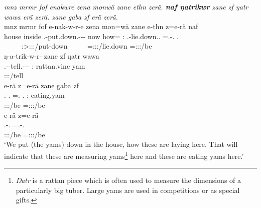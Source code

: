 \begin{exe}
	\ex \emph{mnz mrmr fof enakwre zena monwä zane ethn zerä. \textbf{naf ŋatrikwr} zane zf ŋatr wawa erä zerä. zane gaba zf erä zerä.}\\
	\glll mnz mrmr fof e-nak-w-r-e zena mon=wä zane e-thn z=e-rä naf\\
	house inside {\Emph} \Stnsg.\Alph-put.down.\Ext-\Ndu-\Lk-{\Fnsg} now how={\Emph} \Dem:{\Prox} \Stnsg.\Alph-lie.down.\Ext.{\Ndu} \Prox=\Stnsg.\Alph-\Cop.{\Ndu} \Tsg.{\Erg}\\
	~ ~ ~ {\footnotesize \Fpl:\Sbj>\Stpl:\Obj:\Nonpast:\Ipfv/put-down} ~ ~ ~ {\footnotesize \Prox=\Stpl:\Sbj:\Nonpast:\Ipfv/lie.down} {\footnotesize \Prox=\Stpl:\Sbj:\Nonpast:\Ipfv/be} ~\\
	\sn
	\glll ŋ-a-trik-w-r-\Zero{} zane zf ŋatr wawa\\
	\M.\Alph-\Vc-tell.\Ext-\Ndu-\Lk-\Stsg{} \Dem:{\Prox} {\Imm} rattan.vine yam\\
	{\footnotesize \Stsg:\Sbj:\Nonpast:\Ipfv/tell} ~ ~ ~ ~\\
	\sn
	\glll e-rä z=e-rä zane gaba zf\\
	\Stnsg.\Alph-\Cop.{\Ndu} \Prox=\Stnsg.\Alph-\Cop.{\Ndu} \Dem:{\Prox} eating.yam {\Imm}\\
	{\footnotesize \Stpl:\Sbj:\Nonpast:\Ipfv/be} {\footnotesize \Prox=\Stpl:\Sbj:\Nonpast:\Ipfv/be} ~ ~ ~\\
	\sn
	\glll e-rä z=e-rä\\
	\Stnsg.\Alph-\Cop.{\Ndu} \Prox=\Stnsg.\Alph-\Cop.{\Ndu}\\
	{\footnotesize \Stpl:\Sbj:\Nonpast:\Ipfv/be} {\footnotesize \Prox=\Stpl:\Sbj:\Nonpast:\Ipfv/be}\\
	\trans `We put (the yams) down in the house, how these are laying here. That will indicate that these are measuring yams\footnote{\emph{Ŋatr} is a rattan piece which is often used to measure the dimensions of a particularly big tuber. Large yams are used in competitions or as special gifts.} here and these are eating yams here.'\\ 
	\label{ex167}
\end{exe}

